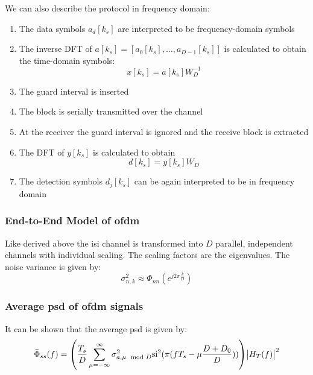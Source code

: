 We can also describe the protocol in frequency domain:
\begin{enumerate}
    \item The data symbols $a_d[k_s]$ are interpreted to be frequency-domain symbols
    \item The inverse DFT of $a[k_s] = \left[a_0[k_s], \ldots, a_{D-1}[k_s]\right]$
        is calculated to obtain the time-domain symbols:
        \begin{equation}
            x[k_s] = a[k_s] W_D^{-1}
        \end{equation}
    \item The guard interval is inserted
    \item The block is serially transmitted over the channel
    \item At the receiver the guard interval is ignored and the receive block is extracted
    \item The DFT of $y[k_s]$ is calculated to obtain
        \begin{equation}
            d[k_s] = y[k_s] W_D
        \end{equation}
    \item The detection symbols $d_j[k_s]$ can be again interpreted to be in frequency domain
\end{enumerate}

\subsubsection{End-to-End Model of \acl{ofdm}}
Like derived above the \ac{isi} channel is transformed into $D$ parallel, independent
channels with individual scaling. The scaling factors are the eigenvalues. The noise
variance is given by:
\begin{equation}
    \sigma_{n,k}^2 \approx \Phi_{nn}(e^{j 2 \pi \frac{k}{D}})
\end{equation}


\subsubsection{Average \acl{psd} of \acl{ofdm} signals}
It can be shown that the average \acl{psd} is given by:
\begin{equation}
    \bar{\Phi}_{ss}(f) = \left(\frac{T_s}{D} \sum_{\mu = -\infty}^\infty
        \sigma^2_{a, \mu \mod D} \text{si}^2 (\pi (f T_s - \mu \frac{D + D_0}{D}))\right)
        \abs{H_T(f)}^2
\end{equation}

